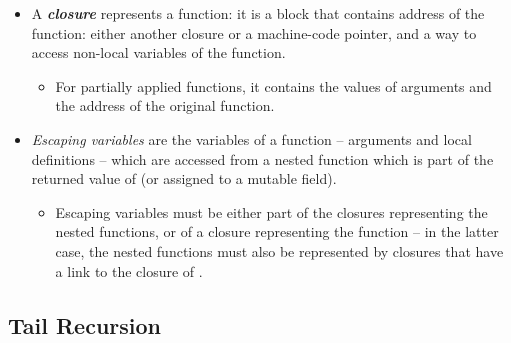 \documentclass{beamer}
\newcommand{\tmem}[1]{{\em #1\/}}
\newcommand{\tmstrong}[1]{\textbf{#1}}
\newcommand{\tmverbatim}[1]{\text{{\ttfamily{#1}}}}
\begin{document}
\begin{itemize}
  \item A {\tmem{{\tmstrong{closure}}}} represents a function: it is a block
  that contains address of the function: either another closure or a
  machine-code pointer, and a way to access non-local variables of the
  function.
  \begin{itemize}
    \item For partially applied functions, it contains the values of arguments
    and the address of the original function.
  \end{itemize}
  \item {\tmem{Escaping variables}} are the variables of a function
  \tmverbatim{f} -- arguments and local definitions -- which are accessed from
  a nested function which is part of the returned value of \tmverbatim{f} (or
  assigned to a mutable field).
  \begin{itemize}
    \item Escaping variables must be either part of the closures representing
    the nested functions, or of a closure representing the function
    \tmverbatim{f} -- in the latter case, the nested functions must also be
    represented by closures that have a link to the closure of \tmverbatim{f}.
  \end{itemize}
\end{itemize}

\subsection{Tail Recursion}
\end{document}
